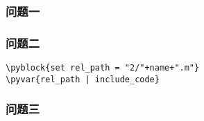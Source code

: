 \subsubsection{问题一}
\subsubsection{问题二}
\textit{}
\begin{lstlisting}[frame=single]
\pyblock{set rel_path = "2/"+name+".m"}
\pyvar{rel_path | include_code}
\end{lstlisting}
\subsubsection{问题三}